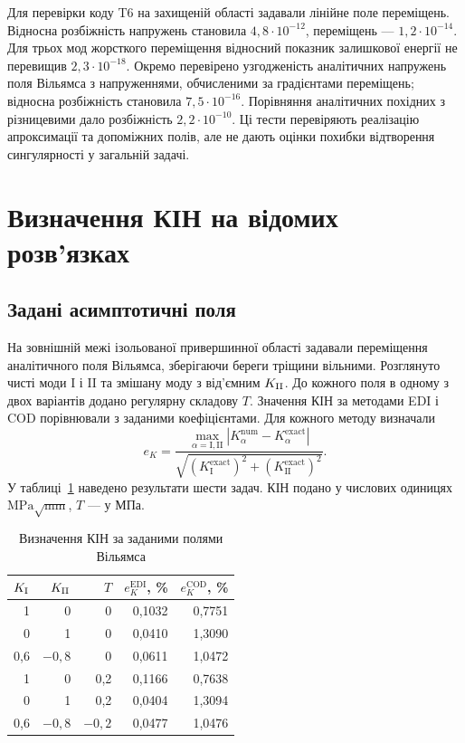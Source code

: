 Для перевірки коду T6 на захищеній області задавали лінійне поле переміщень. Відносна розбіжність напружень становила $4{,}8\cdot10^{-12}$, переміщень --- $1{,}2\cdot10^{-14}$. Для трьох мод жорсткого переміщення відносний показник залишкової енергії не перевищив $2{,}3\cdot10^{-18}$. Окремо перевірено узгодженість аналітичних напружень поля Вільямса з напруженнями, обчисленими за градієнтами переміщень; відносна розбіжність становила $7{,}5\cdot10^{-16}$. Порівняння аналітичних похідних з різницевими дало розбіжність $2{,}2\cdot10^{-10}$. Ці тести перевіряють реалізацію апроксимації та допоміжних полів, але не дають оцінки похибки відтворення сингулярності у загальній задачі.

\section{Визначення КІН на відомих розв'язках}
\label{sec:ver-benchmarks}

\subsection{Задані асимптотичні поля}

На зовнішній межі ізольованої привершинної області задавали переміщення аналітичного поля Вільямса, зберігаючи береги тріщини вільними. Розглянуто чисті моди I і II та змішану моду з від'ємним $K_{\mathrm{II}}$. До кожного поля в одному з двох варіантів додано регулярну складову $T$. Значення КІН за методами EDI і COD порівнювали з заданими коефіцієнтами. Для кожного методу визначали
\begin{equation}
 e_K=\frac{\max_{\alpha=\mathrm I,\mathrm{II}}
 |K_\alpha^{\mathrm{num}}-K_\alpha^{\mathrm{exact}}|}
 {\sqrt{(K_{\mathrm I}^{\mathrm{exact}})^2+
 (K_{\mathrm {II}}^{\mathrm{exact}})^2}}.
 \label{eq:ver-known-error}
\end{equation}
У таблиці~\ref{tab:ver-williams} наведено результати шести задач. КІН подано у числових одиницях $\mathrm{MPa}\sqrt{\mathrm{mm}}$, $T$ --- у МПа.

\begin{table}[htbp]
 \centering
 \caption{Визначення КІН за заданими полями Вільямса}
 \label{tab:ver-williams}
 \begin{tabular}{rrr rr}
 \toprule
 $K_{\mathrm{I}}$ & $K_{\mathrm{II}}$ & $T$ & $e_K^{\mathrm{EDI}}$, \% & $e_K^{\mathrm{COD}}$, \%\\
 \midrule
 1 & 0 & 0 & 0,1032 & 0,7751\\
 0 & 1 & 0 & 0,0410 & 1,3090\\
 0,6 & $-0,8$ & 0 & 0,0611 & 1,0472\\
 1 & 0 & 0,2 & 0,1166 & 0,7638\\
 0 & 1 & 0,2 & 0,0404 & 1,3094\\
 0,6 & $-0,8$ & $-0,2$ & 0,0477 & 1,0476\\
 \bottomrule
 \end{tabular}
\end{table}

